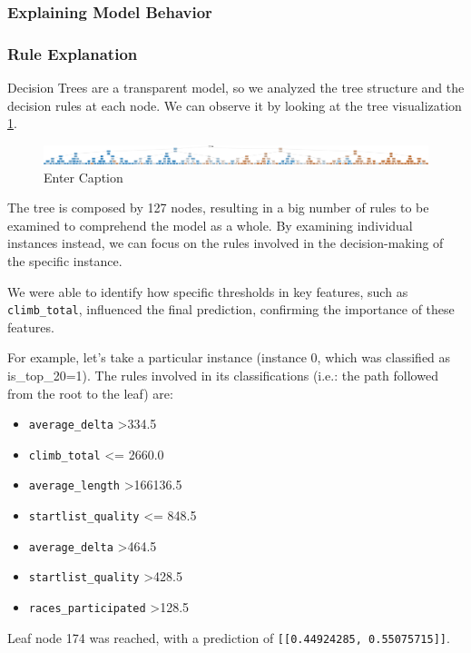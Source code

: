 \documentclass{article}
\begin{document}
\subsubsection{Explaining Model Behavior}

\subsubsection{Rule Explanation}
Decision Trees are a transparent model, so we analyzed the tree structure and the decision rules at each node. We can observe it by looking at the tree visualization \ref{fig:dt}.

\begin{figure}[H]
    \centering
    \includegraphics[width=1\linewidth]{dt.png}
    \caption{Enter Caption}
    \label{fig:dt}
\end{figure}

The tree is composed by 127 nodes, resulting in a big number of rules to be examined to comprehend the model as a whole. By examining individual instances instead, we can focus on the rules involved in the decision-making of the specific instance. 

We were able to identify how specific thresholds in key features, such as \texttt{climb\_total}, influenced the final prediction, confirming the importance of these features. 

For example, let's take a particular instance (instance 0, which was classified as is\_top\_20=1). The rules involved in its classifications (i.e.: the path followed from the root to the leaf) are:

\begin{itemize}
    \item \texttt{average\_delta} \textgreater 334.5
    \item \texttt{climb\_total} \textless= 2660.0
    \item \texttt{average\_length} \textgreater 166136.5
    \item \texttt{startlist\_quality} \textless= 848.5
    \item \texttt{average\_delta} \textgreater 464.5
    \item \texttt{startlist\_quality} \textgreater 428.5
    \item \texttt{races\_participated} \textgreater 128.5
\end{itemize}
Leaf node 174 was reached, with a prediction of \texttt{[[0.44924285, 0.55075715]]}.
\end{document}
